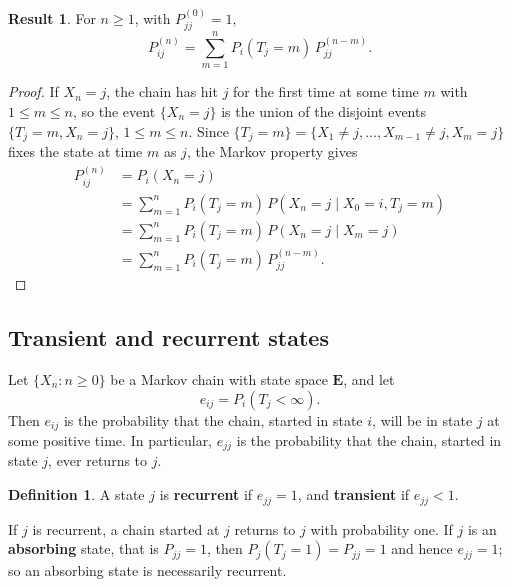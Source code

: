 \documentclass[11pt,a4paper]{article}
\theoremstyle{definition}
\newtheorem{defn}[thm]{Definition}
\newtheorem{result}[thm]{Result}
\begin{document}
\begin{result}\label{res:first-passage}
For $n \ge 1$, with $P^{(0)}_{jj} = 1$,
\[
P^{(n)}_{ij} = \sum_{m=1}^nP_i(T_j = m)\,P^{(n-m)}_{jj} .
\]
\end{result}

\begin{proof}
If $X_n = j$, the chain has hit $j$ for the first time at some time $m$ with $1 \le m \le n$, so the event $\{X_n = j\}$ is the union of the disjoint events
$\{T_j = m, X_n = j\}$, $1 \le m \le n$. Since $\{T_j = m\} = \{X_1 \ne j, \dots, X_{m-1} \ne j, X_m = j\}$ fixes the state at time $m$ as $j$, the
Markov property gives
\begin{align*}
P^{(n)}_{ij} &= P_i(X_n = j) \\
&= \sum_{m=1}^nP_i(T_j = m)\,P(X_n = j \mid X_0 = i, T_j = m) \\
&= \sum_{m=1}^nP_i(T_j = m)\,P(X_n = j \mid X_m = j) \\
&= \sum_{m=1}^nP_i(T_j = m)\,P^{(n-m)}_{jj} .
\end{align*}
\end{proof}

\subsection{Transient and recurrent states}
Let $\{X_n : n \ge 0\}$ be a Markov chain with state space $\mathbf E$, and let
\[
e_{ij} = P_i(T_j < \infty) .
\]
Then $e_{ij}$ is the probability that the chain, started in state $i$, will be in state $j$ at some positive time. In particular, $e_{jj}$ is the probability
that the chain, started in state $j$, ever returns to $j$.

\begin{defn}
A state $j$ is \textbf{recurrent} if $e_{jj} = 1$, and \textbf{transient} if $e_{jj} < 1$.
\end{defn}

If $j$ is recurrent, a chain started at $j$ returns to $j$ with probability one. If $j$ is an \textbf{absorbing} state, that is $P_{jj} = 1$, then
$P_j(T_j = 1) = P_{jj} = 1$ and hence $e_{jj} = 1$; so an absorbing state is necessarily recurrent.
\end{document}
